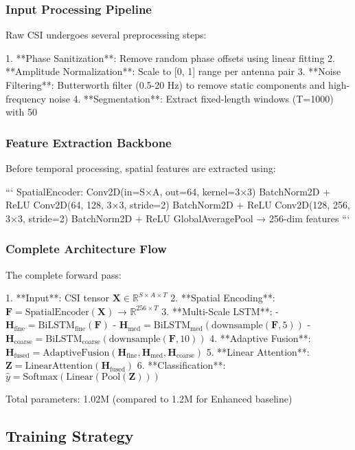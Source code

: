\documentclass[10pt,journal,compsoc]{IEEEtran}
\begin{document}
\subsubsection{Input Processing Pipeline}

Raw CSI undergoes several preprocessing steps:

1. **Phase Sanitization**: Remove random phase offsets using linear fitting
2. **Amplitude Normalization**: Scale to [0, 1] range per antenna pair
3. **Noise Filtering**: Butterworth filter (0.5-20 Hz) to remove static components and high-frequency noise
4. **Segmentation**: Extract fixed-length windows (T=1000) with 50%

\subsubsection{Feature Extraction Backbone}

Before temporal processing, spatial features are extracted using:

```
SpatialEncoder:
  Conv2D(in=S×A, out=64, kernel=3×3)
  BatchNorm2D + ReLU
  Conv2D(64, 128, 3×3, stride=2)
  BatchNorm2D + ReLU  
  Conv2D(128, 256, 3×3, stride=2)
  BatchNorm2D + ReLU
  GlobalAveragePool → 256-dim features
```

\subsubsection{Complete Architecture Flow}

The complete forward pass:

1. **Input**: CSI tensor $\mathbf{X} \in \mathbb{R}^{S \times A \times T}$
2. **Spatial Encoding**: $\mathbf{F} = \text{SpatialEncoder}(\mathbf{X})$ → $\mathbb{R}^{256 \times T}$
3. **Multi-Scale LSTM**: 
   - $\mathbf{H}_{\text{fine}} = \text{BiLSTM}_{\text{fine}}(\mathbf{F})$
   - $\mathbf{H}_{\text{med}} = \text{BiLSTM}_{\text{med}}(\text{downsample}(\mathbf{F}, 5))$
   - $\mathbf{H}_{\text{coarse}} = \text{BiLSTM}_{\text{coarse}}(\text{downsample}(\mathbf{F}, 10))$
4. **Adaptive Fusion**: $\mathbf{H}_{\text{fused}} = \text{AdaptiveFusion}(\mathbf{H}_{\text{fine}}, \mathbf{H}_{\text{med}}, \mathbf{H}_{\text{coarse}})$
5. **Linear Attention**: $\mathbf{Z} = \text{LinearAttention}(\mathbf{H}_{\text{fused}})$
6. **Classification**: $\hat{y} = \text{Softmax}(\text{Linear}(\text{Pool}(\mathbf{Z})))$

Total parameters: 1.02M (compared to 1.2M for Enhanced baseline)

\subsection{Training Strategy}
\end{document}
